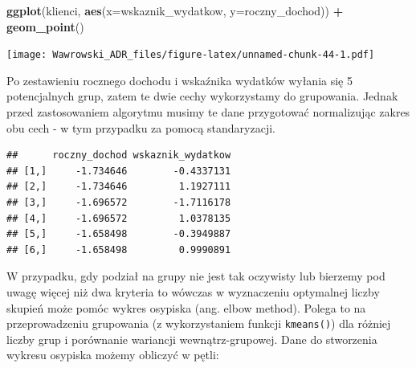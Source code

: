 \documentclass[
]{book}
\newenvironment{Shaded}{\begin{snugshade}}{\end{snugshade}}
\newcommand{\DataTypeTok}[1]{\textcolor[rgb]{0.13,0.29,0.53}{#1}}
\newcommand{\KeywordTok}[1]{\textcolor[rgb]{0.13,0.29,0.53}{\textbf{#1}}}
\newcommand{\NormalTok}[1]{#1}
\newcommand{\OperatorTok}[1]{\textcolor[rgb]{0.81,0.36,0.00}{\textbf{#1}}}
\newcommand{\StringTok}[1]{\textcolor[rgb]{0.31,0.60,0.02}{#1}}
\begin{document}
\begin{Shaded}
\begin{Highlighting}[]
\KeywordTok{ggplot}\NormalTok{(klienci, }\KeywordTok{aes}\NormalTok{(}\DataTypeTok{x=}\NormalTok{wskaznik_wydatkow, }\DataTypeTok{y=}\NormalTok{roczny_dochod)) }\OperatorTok{+}
\StringTok{  }\KeywordTok{geom_point}\NormalTok{()}
\end{Highlighting}
\end{Shaded}

\texttt{[image: Wawrowski\_ADR\_files/figure-latex/unnamed-chunk-44-1.pdf]}

Po zestawieniu rocznego dochodu i wskaźnika wydatków wyłania się 5 potencjalnych grup, zatem te dwie cechy wykorzystamy do grupowania. Jednak przed zastosowaniem algorytmu musimy te dane przygotować normalizując zakres obu cech - w tym przypadku za pomocą standaryzacji.

\begin{Shaded}
\end{Shaded}

\begin{verbatim}
##      roczny_dochod wskaznik_wydatkow
## [1,]     -1.734646        -0.4337131
## [2,]     -1.734646         1.1927111
## [3,]     -1.696572        -1.7116178
## [4,]     -1.696572         1.0378135
## [5,]     -1.658498        -0.3949887
## [6,]     -1.658498         0.9990891
\end{verbatim}

W przypadku, gdy podział na grupy nie jest tak oczywisty lub bierzemy pod uwagę więcej niż dwa kryteria to wówczas w wyznaczeniu optymalnej liczby skupień może pomóc wykres osypiska (ang. elbow method). Polega to na przeprowadzeniu grupowania (z wykorzystaniem funkcji \texttt{kmeans()}) dla różniej liczby grup i porównanie wariancji wewnątrz-grupowej. Dane do stworzenia wykresu osypiska możemy obliczyć w pętli:
\end{document}
